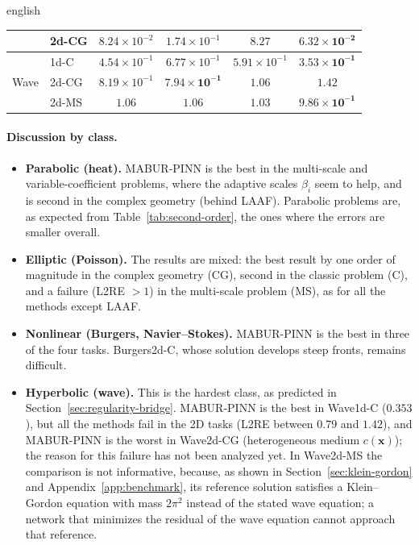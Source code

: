 \documentclass[../0000.tex]{subfiles}
\begin{document}
\begin{hyphenrules}{english}
\begin{table}[htbp]
\begin{tabular}{@{}llcccc@{}}
                                    & 2d-CG & $8.24\times10^{-2}$ & $1.74\times10^{-1}$ & $8.27$ & $\mathbf{6.32\times10^{-2}}$ \\
    \midrule
    \multirow{3}{*}{Wave}    & 1d-C  & $4.54\times10^{-1}$ & $6.77\times10^{-1}$ & $5.91\times10^{-1}$ & $\mathbf{3.53\times10^{-1}}$ \\
                             & 2d-CG & $8.19\times10^{-1}$ & $\mathbf{7.94\times10^{-1}}$ & $1.06$ & $1.42$ \\
                             & 2d-MS & $1.06$ & $1.06$ & $1.03$ & $\mathbf{9.86\times10^{-1}}$ \\
    \bottomrule
  \end{tabular}
\end{table}

\paragraph{Discussion by class.}
\begin{itemize}
  \item \textbf{Parabolic (heat).} MABUR-PINN is the best in the multi-scale and variable-coefficient
    problems, where the adaptive scales $\beta_i$ seem to help, and is second in the complex geometry
    (behind LAAF). Parabolic problems are, as expected from Table~\ref{tab:second-order}, the ones where the
    errors are smaller overall.
  \item \textbf{Elliptic (Poisson).} The results are mixed: the best result by one order of magnitude in
    the complex geometry (CG), second in the classic problem (C), and a failure (L2RE $>1$) in the
    multi-scale problem (MS), as for all the methods except LAAF.
  \item \textbf{Nonlinear (Burgers, Navier--Stokes).} MABUR-PINN is the best in three of the four tasks.
    Burgers2d-C, whose solution develops steep fronts, remains difficult.
  \item \textbf{Hyperbolic (wave).} This is the hardest class, as predicted in
    Section~\ref{sec:regularity-bridge}. MABUR-PINN is the best in Wave1d-C ($0.353$), but all the methods fail
    in the 2D tasks (L2RE between $0.79$ and $1.42$), and MABUR-PINN is the worst in Wave2d-CG (heterogeneous medium
    $c(\mathbf{x})$); the reason for this failure has not been analyzed yet. In Wave2d-MS the comparison is not informative, because, as shown
    in Section~\ref{sec:klein-gordon} and Appendix~\ref{app:benchmark}, its reference solution satisfies a Klein--Gordon
    equation with mass $2\pi^2$ instead of the stated wave equation; a network that minimizes the residual
    of the wave equation cannot approach that reference.
\end{itemize}


\end{hyphenrules}
\end{document}
